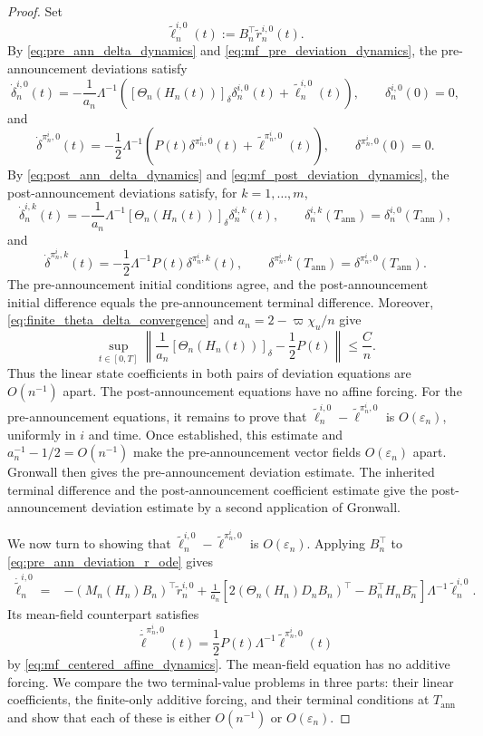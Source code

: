 \documentclass[12pt]{article}
\numberwithin{equation}{section}
\theoremstyle{definition}
\begin{document}
\begin{proof}
Set
\[
\widetilde\ell_n^{i,0}(t)
:=B_n^\top\widetilde r_n^{i,0}(t).
\]
By \eqref{eq:pre_ann_delta_dynamics} and
\eqref{eq:mf_pre_deviation_dynamics}, the pre-announcement deviations satisfy
\[
\dot\delta_n^{i,0}(t)
=
-\frac1{a_n}\Lambda^{-1}
\left(
[\Theta_n(H_n(t))]_{\delta}\delta_n^{i,0}(t)
+\widetilde\ell_n^{i,0}(t)
\right),
\qquad
\delta_n^{i,0}(0)=0,
\]
and
\[
\dot\delta^{\pi_n^i,0}(t)
=
-\frac12\Lambda^{-1}
\left(
P(t)\delta^{\pi_n^i,0}(t)
+\widetilde\ell^{\pi_n^i,0}(t)
\right),
\qquad
\delta^{\pi_n^i,0}(0)=0.
\]
By \eqref{eq:post_ann_delta_dynamics} and
\eqref{eq:mf_post_deviation_dynamics}, the post-announcement deviations
satisfy, for \(k=1,\ldots,m\),
\[
\dot\delta_n^{i,k}(t)
=
-\frac1{a_n}\Lambda^{-1}
[\Theta_n(H_n(t))]_{\delta}\delta_n^{i,k}(t),
\qquad
\delta_n^{i,k}(T_{\mathrm{ann}})
=\delta_n^{i,0}(T_{\mathrm{ann}}),
\]
and
\[
\dot\delta^{\pi_n^i,k}(t)
=
-\frac12\Lambda^{-1}P(t)\delta^{\pi_n^i,k}(t),
\qquad
\delta^{\pi_n^i,k}(T_{\mathrm{ann}})
=\delta^{\pi_n^i,0}(T_{\mathrm{ann}}).
\]
The pre-announcement initial conditions agree, and the post-announcement
initial difference equals the pre-announcement terminal difference. Moreover,
\eqref{eq:finite_theta_delta_convergence} and
\(a_n=2-\varpi\chi_u/n\) give
\begin{equation}\label{eq:finite_deviation_coefficient_convergence}
\sup_{t\in[0,T]}
\left\|
\frac1{a_n}[\Theta_n(H_n(t))]_{\delta}
-\frac12P(t)
\right\|
\leq
\frac{C}{n}.
\end{equation}
Thus the linear state coefficients in both pairs of deviation equations are
\(O(n^{-1})\) apart. The post-announcement equations have no affine forcing.
For the pre-announcement equations, it remains to prove that
\(\widetilde\ell_n^{i,0}-\widetilde\ell^{\pi_n^i,0}\) is
\(O(\varepsilon_n)\), uniformly in \(i\) and time. Once established, this
estimate and \(a_n^{-1}-1/2=O(n^{-1})\) make the pre-announcement vector
fields \(O(\varepsilon_n)\) apart. Gronwall then gives the pre-announcement
deviation estimate. The inherited terminal difference and the
post-announcement coefficient estimate give the post-announcement deviation
estimate by a second application of Gronwall.

We now turn to showing that \(\widetilde\ell_n^{i,0}-\widetilde\ell^{\pi_n^i,0}\) is
\(O(\varepsilon_n)\). Applying \(B_n^\top\) to \eqref{eq:pre_ann_deviation_r_ode} gives
\[
\begin{aligned}
\dot{\widetilde\ell}_n^{i,0}
={}&
-\left(M_n(H_n)B_n\right)^\top\widetilde r_n^{i,0}
+\frac1{a_n}
\left[
2\left(\Theta_n(H_n)D_nB_n\right)^\top
-B_n^\top H_nB_n^-
\right]
\Lambda^{-1}\widetilde\ell_n^{i,0}.
\end{aligned}
\]
Its mean-field counterpart satisfies
\[
\dot{\widetilde\ell}^{\pi_n^i,0}(t)
=
\frac12P(t)\Lambda^{-1}\widetilde\ell^{\pi_n^i,0}(t)
\]
by \eqref{eq:mf_centered_affine_dynamics}. The mean-field equation has no
additive forcing. We compare the two terminal-value problems in three parts:
their linear coefficients, the finite-only additive forcing, and their
terminal conditions at \(T_{\mathrm{ann}}\) and show that each of these is either \(O(n^{-1})\) or \(O(\varepsilon_n)\).


\end{proof}
\end{document}
